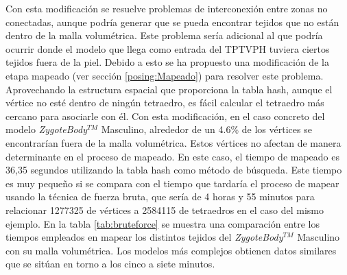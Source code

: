 Con esta modificación se resuelve problemas de interconexión entre zonas no conectadas, aunque podría generar que se pueda encontrar tejidos que no están dentro de la malla volumétrica. Este problema sería adicional al que podría ocurrir donde el modelo que llega como entrada del \ac{TPTVPH} tuviera ciertos tejidos fuera de la piel. Debido a esto se ha propuesto una modificación de la etapa mapeado (ver sección \ref{posing:Mapeado}) para resolver este problema. Aprovechando la estructura espacial que proporciona la \ac{tabla hash}, aunque el vértice no esté dentro de ningún tetraedro, es fácil calcular el tetraedro más cercano para asociarle con él. Con esta modificación, en el caso concreto del modelo \emph{ZygoteBody}$^{TM}$ Masculino, alrededor de un 4.6\% de los vértices se encontrarían fuera de la malla volumétrica. 
Estos vértices no afectan de manera determinante en el proceso de mapeado. En este caso, el tiempo de mapeado es 36,35 segundos utilizando la \ac{tabla hash} como método de búsqueda. Este tiempo es muy pequeño si se compara con el tiempo que tardaría el proceso de mapear usando la técnica de fuerza bruta, que sería de 4 horas y 55 minutos para relacionar 1277325 de vértices a 2584115 de tetraedros en el caso del mismo ejemplo.  En la tabla \ref{tab:bruteforce} se muestra una comparación entre los tiempos empleados en mapear los distintos tejidos del \emph{ZygoteBody}$^{TM}$ Masculino con su malla volumétrica. Los modelos más complejos obtienen datos similares que se sitúan en torno a los cinco a siete minutos.


       
        



